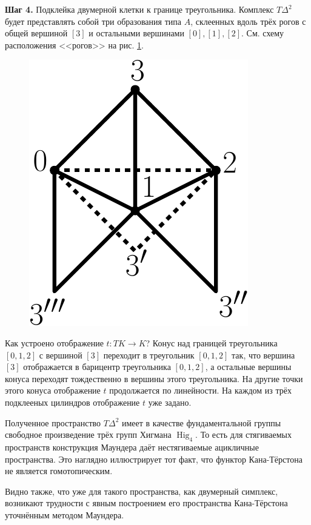 \documentclass[14pt, dvipsnames, twoside]{extarticle}
\theoremstyle{definition}
\theoremstyle{remark}
\DeclareMathOperator{\Hig}{\mathrm{Hig}}
\begin{document}
{\bf Шаг 4.} Подклейка двумерной клетки к границе треугольника. Комплекс $T\Delta^2$ будет представлять собой три образования типа $A$, склеенных вдоль трёх рогов с общей вершиной $[3]$ и остальными вершинами $[0], [1], [2]$. См. схему расположения <<рогов>> на рис. \ref{pict_7}.

\begin{figure}
\begin{center}
\includegraphics[scale=0.7]{pict7}
\caption{}\label{pict_7}
\end{center}
\end{figure}

Как устроено отображение $t: TK\to K$? Конус над границей треугольника $[0, 1, 2]$ с вершиной $[3]$ переходит в треугольник $[0, 1, 2]$ так, что вершина $[3]$ отображается в барицентр треугольника $[0, 1, 2]$, а остальные вершины конуса переходят тождественно в вершины этого треугольника. На другие точки этого конуса отображение $t$ продолжается по линейности. На каждом из трёх подклееных цилиндров отображение $t$ уже задано.    
 
Полученное пространство $T\Delta^2$ имеет в качестве фундаментальной группы свободное произведение трёх групп Хигмана $\Hig_4$. То есть для стягиваемых пространств конструкция Маундера даёт нестягиваемые ацикличные пространства. Это наглядно иллюстрирует тот факт, что функтор Кана-Тёрстона не является гомотопическим.

Видно также, что уже для такого пространства, как двумерный симплекс, возникают трудности с явным построением его пространства Кана-Тёрстона уточнённым методом Маундера.
\end{document}
